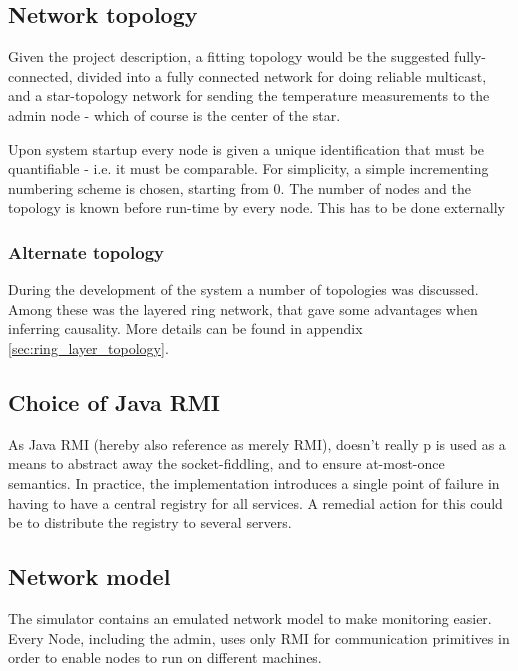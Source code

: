 \documentclass[10pt,a4paper]{article}
\begin{document}
\subsection{Network topology}
Given the project description, a fitting topology would be the suggested fully-connected, divided into a fully connected network for doing reliable multicast, and a star-topology network for sending the temperature measurements to the admin node - which of course is the center of the star.

Upon system startup every node is given a unique identification that must be quantifiable - i.e. it must be comparable. For simplicity, a simple incrementing numbering scheme is chosen, starting from 0. The number of nodes and the topology is known before run-time by every node. This has to be done externally

\subsubsection{Alternate topology}
During the development of the system a number of topologies was discussed. Among these was the layered ring network, that gave some advantages when inferring causality. More details can be found in appendix \ref{sec:ring_layer_topology}.

\subsection{Choice of Java RMI}
As Java RMI (hereby also reference as merely RMI), doesn't really p
is used as a means to abstract away the socket-fiddling, and to ensure at-most-once semantics. In practice, the implementation introduces a single point of failure in having to have a central registry for all services. A remedial action for this could be to distribute the registry to several servers.

\subsection{Network model}
The simulator contains an emulated network model to make monitoring easier. Every Node, including the admin, uses only RMI for communication primitives in order to enable nodes to run on different machines.
\end{document}
